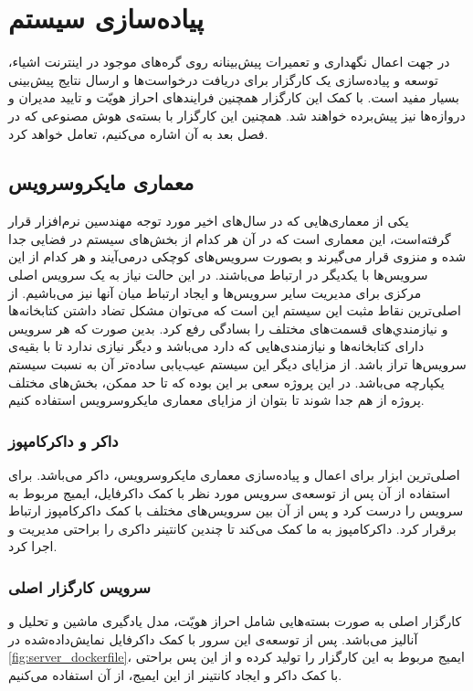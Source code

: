 \chapter{پیاده‌سازی سیستم}

در جهت اعمال نگهداری و تعمیرات پیش‌بینانه روی گره‌های موجود در اینترنت اشیاء، توسعه و پیاده‌سازی یک کارگزار برای دریافت درخواست‌ها و ارسال نتایج پیش‌بینی بسیار مفید است. با کمک این کارگزار همچنین فرایند‌های احراز هویّت و تایید مدیران و دروازه‌ها نیز پیش‌برده خواهند شد. همچنین این کارگزار با بسته‌ی هوش مصنوعی که در فصل بعد به آن اشاره می‌کنیم، تعامل خواهد کرد.


\section{معماری مایکروسرویس}
یکی از معماری‌هایی که در سال‌های اخیر مورد توجه مهندسین نرم‌افزار قرار گرفته‌است، این معماری است که در آن هر کدام از بخش‌های سیستم در فضایی جدا شده و منزوی قرار می‌گیرند
و بصورت سرویس‌های کوچکی درمی‌آیند و هر کدام از این سرویس‌ها با یکدیگر در ارتباط می‌باشند. در این حالت  نیاز به یک سرویس اصلی مرکزی برای مدیریت سایر سرویس‌ها و ایجاد ارتباط میان آنها نیز می‌باشیم. از اصلی‌ترین نقاط مثبت این سیستم این است که می‌توان مشکل تضاد داشتن کتابخانه‌ها و نیازمندي‌های قسمت‌های مختلف را بسادگی رفع کرد. بدین صورت که هر سرویس دارای کتابخانه‌ها و نیازمندی‌هایی که دارد می‌باشد و دیگر نیازی ندارد تا با بقیه‌ی سرویس‌ها تراز باشد. از مزایای دیگر این سیستم عیب‌یابی ساده‌تر آن به نسبت سیستم یکپارچه می‌باشد\cite{thones2015microservices}. در این پروژه سعی بر این بوده که تا حد ممکن، بخش‌های مختلف پروژه از هم جدا شوند تا بتوان از مزایای معماری مایکرو‌سرویس استفاده کنیم.

\subsection{داکر و داکرکامپوز}
اصلی‌ترین ابزار برای اعمال و پیاده‌سازی معماری مایکروسرویس، داکر می‌باشد. برای استفاده از آن پس از توسعه‌ی سرویس مورد نظر با کمک داکرفایل، ایمیج مربوط به سرویس را درست کرد و پس از آن بین سرویس‌های مختلف با کمک داکرکامپوز ارتباط برقرار کرد. داکرکامپوز به ما کمک می‌کند تا چندین کانتینر داکری را براحتی مدیریت و اجرا کرد.

\subsection{سرویس کارگزار اصلی}
کارگزار اصلی به صورت بسته‌هایی شامل احراز هویّت، مدل یادگیری ماشین و تحلیل و آنالیز می‌باشد. پس از توسعه‌ی این سرور با کمک داکرفایل نمایش‌داده‌شده در \cref{fig:server_dockerfile}، ایمیج مربوط به این کارگزار را تولید کرده و از این پس براحتی با کمک داکر و ایجاد کانتینر از این ایمیج، از آن استفاده می‌کنیم.

